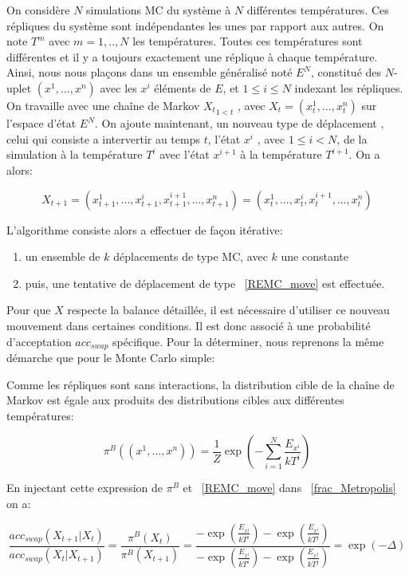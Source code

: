 On considère $N$ simulations MC du système à $N$ différentes températures. Ces répliques du système sont indépendantes les unes par rapport aux autres. On note $T^m$ avec $m=1,..,N$ les températures. Toutes ces températures sont différentes et il y a toujours exactement une réplique à chaque température. Ainsi, nous nous plaçons dans un ensemble généralisé noté $E^N$, constitué des $N$-uplet $(x^1,...,x^n)$ avec les $x^i$ éléments de $E$, et $1 \leq i \leq N$  indexant les répliques. On travaille avec une chaîne de Markov ${X_t}_{1<t}$ , avec $X_t=(x^1_t,...,x^n_t)$ sur l'espace d'état $E^N$. On ajoute maintenant, un nouveau type de déplacement , celui qui consiste a intervertir au temps $t$, l'état $x^i$ , avec $1 \leq i <  N$, de la simulation à la température $T^i$ avec l'état $x^{i+1}$ à la température $T^{i+1}$. On a alors:

\begin{equation}
  \label{REMC_move}
X_{t+1}=(x_{t+1}^1,...,x_{t+1}^i,x_{t+1}^{i+1},...,x_{t+1}^n) = (x_t^1,...,x_t^i,x_t^{i+1},...,x_t^n)
\end{equation}

L'algorithme consiste alors a effectuer de façon itérative:
\begin{enumerate}
\item un ensemble de $k$ déplacements de type MC, avec $k$ une constante  

\item puis, une tentative de déplacement de type ~\ref{REMC_move}  est effectuée.
\end{enumerate}

Pour que $X$ respecte la balance détaillée, il est nécessaire d'utiliser ce nouveau mouvement dans certaines conditions. Il est donc associé à une probabilité d'acceptation $acc_{swap}$ spécifique. Pour la déterminer, nous reprenons la même démarche que pour le Monte Carlo simple:

Comme les répliques sont sans interactions, la distribution cible de la chaîne de Markov est égale aux produits des distributions cibles aux différentes températures:

\begin{equation}
\pi^B((x^1,...,x^n))=\frac{1}{Z} \exp(-\sum_{i=1}^N \frac{E_{x^i}}{kT^i})
\end{equation}


En injectant cette expression de $\pi^B$ et ~\ref{REMC_move} dans ~\ref{frac_Metropolis} on a:



\begin{equation}
\frac{acc_{swap}(X_{t+1}|X_t)}{acc_{swap}(X_t|X_{t+1})} =\frac{\pi^B(X_t)}{\pi^B(X_{t+1})}  = \frac{ -\exp(\frac{E_{x^j}}{kT^i}) -\exp(\frac{E_{x^i}}{kT^j})}{-\exp(\frac{E_{x^i}}{kT^i}) -\exp(\frac{E_{x^j}}{kT^j})} = \exp(-\Delta) 
\end{equation}


